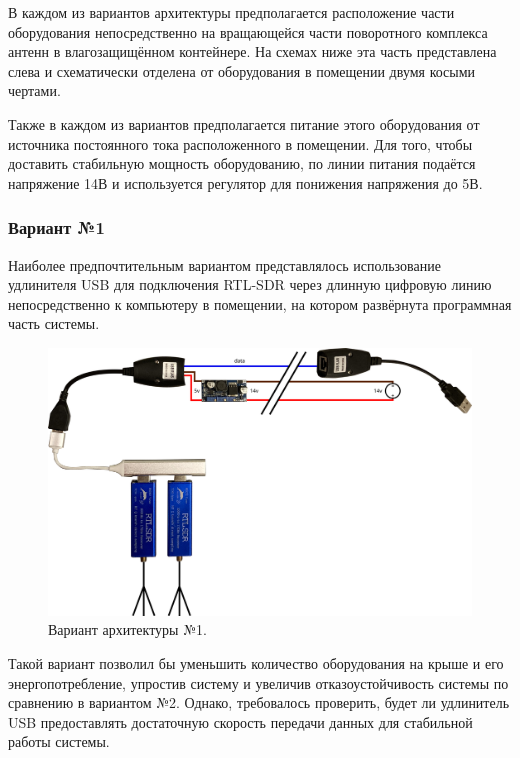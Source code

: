 \documentclass[a4paper, 14pt, titlepage, fleqn]{extarticle}
\begin{document}
	В каждом из вариантов архитектуры предполагается расположение части оборудования непосредственно на вращающейся части поворотного комплекса антенн в влагозащищённом контейнере. На схемах ниже эта часть представлена слева и схематически отделена от оборудования в помещении двумя косыми чертами.
	
	Также в каждом из вариантов предполагается питание этого оборудования от источника постоянного тока расположенного в помещении. Для того, чтобы доставить стабильную мощность оборудованию, по линии питания подаётся напряжение 14В и используется регулятор для понижения напряжения до 5В.
	
	\pagebreak
	\subsubsection*{Вариант №1}
	
	Наиболее предпочтительным вариантом представлялось использование удлинителя USB для подключения RTL-SDR через длинную цифровую линию непосредственно к компьютеру в помещении, на котором развёрнута программная часть системы.
	
	\begin{figure}[H]
		\centering
		\includegraphics[width=\textwidth]{plana.png}
		\caption{Вариант архитектуры №1.}
	\end{figure}
	
	Такой вариант позволил бы уменьшить количество оборудования на крыше и его энергопотребление, упростив систему и увеличив отказоустойчивость системы по сравнению в вариантом №2. Однако, требовалось проверить, будет ли удлинитель USB предоставлять достаточную скорость передачи данных для стабильной работы системы.
	
\end{document}
